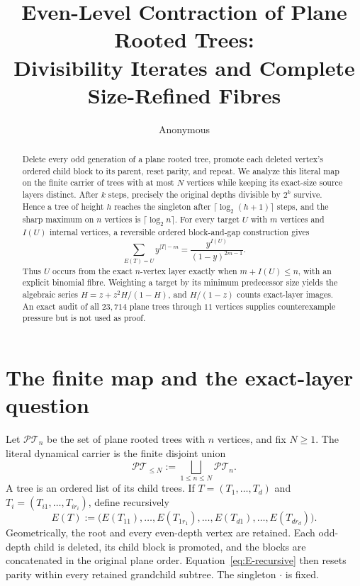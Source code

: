 \documentclass[a4paper,10pt]{amsart}
\title[Even-level plane-tree contraction]{Even-Level Contraction of Plane Rooted Trees:\\
Divisibility Iterates and Complete Size-Refined Fibres}
\author{Anonymous}
\date{}
\theoremstyle{definition}
\theoremstyle{remark}
\newcommand{\PT}{\mathcal{PT}}
\newcommand{\one}{\boldsymbol{\cdot}}
\begin{document}
\begin{abstract}
Delete every odd generation of a plane rooted tree, promote each deleted
vertex's ordered child block to its parent, reset parity, and repeat.  We
analyze this literal map on the finite carrier of trees with at most $N$
vertices while keeping its exact-size source layers distinct.  After $k$
steps, precisely the original depths divisible by $2^k$ survive.  Hence a
tree of height $h$ reaches the singleton after
$\lceil\log_2(h+1)\rceil$ steps, and the sharp maximum on $n$ vertices is
$\lceil\log_2n\rceil$.  For every target $U$ with $m$ vertices and $I(U)$
internal vertices, a reversible ordered block-and-gap construction gives
\[
 \sum_{E(T)=U}y^{|T|-m}=\frac{y^{I(U)}}{(1-y)^{2m-1}}.
\]
Thus $U$ occurs from the exact $n$-vertex layer exactly when
$m+I(U)\le n$, with an explicit binomial fibre.  Weighting a target by its
minimum predecessor size yields the algebraic series
$H=z+z^2H/(1-H)$, and $H/(1-z)$ counts exact-layer images.  An exact audit of
all $23{,}714$ plane trees through $11$ vertices supplies counterexample
pressure but is not used as proof.
\end{abstract}

\maketitle

\section{The finite map and the exact-layer question}

Let $\PT_n$ be the set of plane rooted trees with $n$ vertices, and fix
$N\ge1$.  The literal dynamical carrier is the finite disjoint union
\[
                  \PT_{\le N}:=\bigsqcup_{1\le n\le N}\PT_n.
\]
A tree is an ordered list of its child trees.  If
$T=(T_1,\ldots,T_d)$ and
$T_i=(T_{i1},\ldots,T_{ir_i})$, define recursively
\begin{equation}\label{eq:E-recursive}
 E(T):=\bigl(E(T_{11}),\ldots,E(T_{1r_1}),
             \ldots,E(T_{d1}),\ldots,E(T_{dr_d})\bigr).
\end{equation}
Geometrically, the root and every even-depth vertex are retained.  Each
odd-depth child is deleted, its child block is promoted, and the blocks are
concatenated in the original plane order.  Equation~\eqref{eq:E-recursive}
then resets parity within every retained grandchild subtree.  The singleton
$\one$ is fixed.
\end{document}
